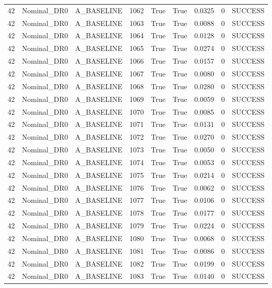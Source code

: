 \documentclass[11pt,a4paper,oneside]{book}
\begin{document}
\begin{longtable}{l l l l l l l l l}
42 & Nominal\_DR0 & A\_BASELINE & 1062 & True & True & 0.0325 & 0 & SUCCESS \\
42 & Nominal\_DR0 & A\_BASELINE & 1063 & True & True & 0.0088 & 0 & SUCCESS \\
42 & Nominal\_DR0 & A\_BASELINE & 1064 & True & True & 0.0128 & 0 & SUCCESS \\
42 & Nominal\_DR0 & A\_BASELINE & 1065 & True & True & 0.0274 & 0 & SUCCESS \\
42 & Nominal\_DR0 & A\_BASELINE & 1066 & True & True & 0.0157 & 0 & SUCCESS \\
42 & Nominal\_DR0 & A\_BASELINE & 1067 & True & True & 0.0080 & 0 & SUCCESS \\
42 & Nominal\_DR0 & A\_BASELINE & 1068 & True & True & 0.0280 & 0 & SUCCESS \\
42 & Nominal\_DR0 & A\_BASELINE & 1069 & True & True & 0.0059 & 0 & SUCCESS \\
42 & Nominal\_DR0 & A\_BASELINE & 1070 & True & True & 0.0085 & 0 & SUCCESS \\
42 & Nominal\_DR0 & A\_BASELINE & 1071 & True & True & 0.0131 & 0 & SUCCESS \\
42 & Nominal\_DR0 & A\_BASELINE & 1072 & True & True & 0.0270 & 0 & SUCCESS \\
42 & Nominal\_DR0 & A\_BASELINE & 1073 & True & True & 0.0050 & 0 & SUCCESS \\
42 & Nominal\_DR0 & A\_BASELINE & 1074 & True & True & 0.0053 & 0 & SUCCESS \\
42 & Nominal\_DR0 & A\_BASELINE & 1075 & True & True & 0.0214 & 0 & SUCCESS \\
42 & Nominal\_DR0 & A\_BASELINE & 1076 & True & True & 0.0062 & 0 & SUCCESS \\
42 & Nominal\_DR0 & A\_BASELINE & 1077 & True & True & 0.0106 & 0 & SUCCESS \\
42 & Nominal\_DR0 & A\_BASELINE & 1078 & True & True & 0.0177 & 0 & SUCCESS \\
42 & Nominal\_DR0 & A\_BASELINE & 1079 & True & True & 0.0224 & 0 & SUCCESS \\
42 & Nominal\_DR0 & A\_BASELINE & 1080 & True & True & 0.0068 & 0 & SUCCESS \\
42 & Nominal\_DR0 & A\_BASELINE & 1081 & True & True & 0.0086 & 0 & SUCCESS \\
42 & Nominal\_DR0 & A\_BASELINE & 1082 & True & True & 0.0199 & 0 & SUCCESS \\
42 & Nominal\_DR0 & A\_BASELINE & 1083 & True & True & 0.0140 & 0 & SUCCESS \\

\end{longtable}
\end{document}
